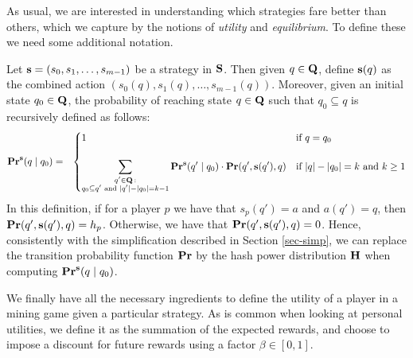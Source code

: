 As usual, we are interested in understanding which strategies fare better than others, which we capture by the notions of 
\emph{utility} and \emph{equilibrium}. To define these we need some additional notation. 

Let $\mathbf{s} = (s_0, s_1, \ldots, s_{m-1})$ be a strategy in $\mathbf{S}$. Then given $q \in \mathbf{Q}$, define $\mathbf{s}(q)$ as the combined action $(s_0(q), s_1(q), \ldots, s_{m-1}(q))$. Moreover, given an initial state $q_0 \in \mathbf{Q}$, 
the probability of reaching state $q \in \mathbf{Q}$ such that $q_0 \subseteq q$ is recursively defined as follows:
\begin{eqnarray*}
\mathbf{Pr}^{\mathbf{s}}(q \mid q_0) & = &
\begin{cases}
1 & \text{if } q =  q_0\\
& \\
{\displaystyle \sum_{\substack{q' \in \mathbf{Q} \,:\\ q_0 \subseteq q' \text{ and } |q'| - |q_0| = k-1}} \mathbf{Pr}^{\mathbf{s}}(q' \mid q_0) \cdot \mathbf{Pr}(q', \mathbf{s}(q'), q)}
 & \text{if } |q| - |q_0| = k \text{ and } k \geq 1
\end{cases}
\end{eqnarray*}
In this definition, if for a player $p$ we have that $s_p(q') = a$ and $a(q') = q$, then $\mathbf{Pr}(q', \mathbf{s}(q'), q) = h_p$. Otherwise, we have that $\mathbf{Pr}(q', \mathbf{s}(q'), q) = 0$. Hence, consistently with the simplification described in Section \ref{sec-simp}, we can replace the transition probability function $\mathbf{Pr}$ by the hash power distribution $\mathbf{H}$ when computing $\mathbf{Pr}^{\mathbf{s}}(q \mid q_0)$. 

We finally have all the necessary ingredients to define the utility of a player in a mining game given a particular strategy. As is common 
when looking at personal utilities, we define it as the summation of the expected rewards, and choose 
to impose a discount for future rewards using a factor $\beta \in [0,1]$. 


